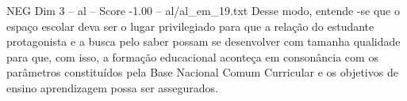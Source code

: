 \begin{textsample}{NEG Dim 3 – al – Score -1.00 – al/al\_em\_19.txt}
Desse modo, entende -se que o espaço escolar deva ser o lugar privilegiado para que a relação do estudante protagonista e a busca pelo saber possam se desenvolver com tamanha qualidade para que, com isso, a formação educacional aconteça em consonância com os parâmetros constituídos pela Base Nacional Comum Curricular e os objetivos de ensino aprendizagem possa ser assegurados.

\end{textsample}
